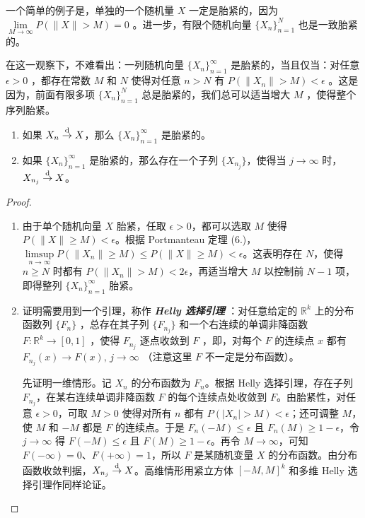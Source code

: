一个简单的例子是，单独的一个随机量 $X$ 一定是胎紧的，因为 $\lim\limits_{M\to\infty} P(\|X\|>M)=0$ 。进一步，有限个随机向量 $\{X_n\}_{n=1}^N$ 也是一致胎紧的。

在这一观察下，不难看出：一列随机向量 $\{X_n\}_{n=1}^\infty$ 是胎紧的，当且仅当：对任意 $\epsilon>0$ ，都存在常数 $M$ 和 $N$ 使得对任意 $n>N$ 有 $P(\|X_n\|>M)<\epsilon$ 。这是因为，前面有限多项 $\{X_n\}_{n=1}^{N}$ 总是胎紧的，我们总可以适当增大 $M$ ，使得整个序列胎紧。

\begin{theorem}[Prohorov 定理]\label{thm:ch1:prohorov}

\label{thm:ch1:1-8}

\begin{enumerate}
\def\labelenumi{\arabic{enumi}.}
\tightlist
\item
  如果 $X_n \overset{\rm d}\to X$，那么 $\{X_n\}_{n=1}^\infty$ 是胎紧的。
\item
  如果 $\{X_n\}_{n=1}^\infty$ 是胎紧的，那么存在一个子列 $\{X_{n_j}\}$，使得当 $j \to \infty$ 时，$X_{n_j}\overset{\rm d}\to X$。
\end{enumerate}

\end{theorem}

\begin{proof}

\begin{enumerate}
  \item[(1.)] 由于单个随机向量 $X$ 胎紧，任取 $\epsilon>0$，都可以选取 $M$ 使得 $P(\|X\|\ge M)<\epsilon$。根据 Portmanteau 定理 (6.)，$\limsup\limits_{n\to\infty}P(\|X_n\|\ge M)\le P(\|X\|\ge M)<\epsilon$。这表明存在 $N$，使得 $n\ge N$ 时都有 $P(\|X_n\|>M)<2\epsilon$，再适当增大 $M$ 以控制前 $N-1$ 项，即得整列 $\{X_n\}_{n=1}^\infty$ 胎紧。
  \item[(2.)] 证明需要用到一个引理，称作 \textbf{\emph{Helly 选择引理}} ：对任意给定的 $\mathbb R^k$ 上的分布函数列 $\{F_n\}$ ，总存在其子列 $\{F_{n_j}\}$ 和一个右连续的单调非降函数 $F:\mathbb R^k\to[0,1]$ ，使得 $F_{n_j}$ 逐点收敛到 $F$ ，即，对每个 $F$ 的连续点 $x$ 都有 $F_{n_j}(x)\to F(x),\,j\to\infty$ （注意这里 $F$ 不一定是分布函数）。


先证明一维情形。记 $X_n$ 的分布函数为 $F_n$。根据 Helly 选择引理，存在子列 $F_{n_j}$，在某右连续单调非降函数 $F$ 的每个连续点处收敛到 $F$。由胎紧性，对任意 $\epsilon>0$，可取 $M>0$ 使得对所有 $n$ 都有 $P(|X_n|>M)<\epsilon$；还可调整 $M$，使 $M$ 和 $-M$ 都是 $F$ 的连续点。于是 $F_n(-M)\le\epsilon$ 且 $F_n(M)\ge1-\epsilon$，令 $j\to\infty$ 得 $F(-M)\le\epsilon$ 且 $F(M)\ge1-\epsilon$。再令 $M\to\infty$，可知 $F(-\infty)=0$、$F(+\infty)=1$，所以 $F$ 是某随机变量 $X$ 的分布函数。由分布函数收敛判据，$X_{n_j}\overset{\rm d}\to X$。高维情形用紧立方体 $[-M,M]^k$ 和多维 Helly 选择引理作同样论证。

\end{enumerate}

\end{proof}

